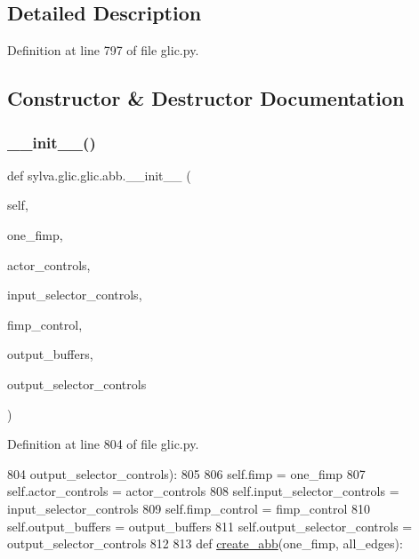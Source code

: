 \subsection{Detailed Description}


Definition at line 797 of file glic.\+py.



\subsection{Constructor \& Destructor Documentation}
\mbox{\label{classsylva_1_1glic_1_1glic_1_1abb_aa11318390c0aca19b3960f881322cf2e}} 
\subsubsection{\texorpdfstring{\+\_\+\+\_\+init\+\_\+\+\_\+()}{\_\_init\_\_()}}
{\footnotesize\ttfamily def sylva.\+glic.\+glic.\+abb.\+\_\+\+\_\+init\+\_\+\+\_\+ (\begin{DoxyParamCaption}\item[{}]{self,  }\item[{}]{one\+\_\+fimp,  }\item[{}]{actor\+\_\+controls,  }\item[{}]{input\+\_\+selector\+\_\+controls,  }\item[{}]{fimp\+\_\+control,  }\item[{}]{output\+\_\+buffers,  }\item[{}]{output\+\_\+selector\+\_\+controls }\end{DoxyParamCaption})}



Definition at line 804 of file glic.\+py.


\begin{DoxyCode}
804                  output\_selector\_controls):
805 
806       self.fimp = one\_fimp
807       self.actor\_controls = actor\_controls
808       self.input\_selector\_controls = input\_selector\_controls
809       self.fimp\_control = fimp\_control
810       self.output\_buffers = output\_buffers
811       self.output\_selector\_controls = output\_selector\_controls
812 
813   \textcolor{keyword}{def }\hyperlink{namespacesylva_1_1glic_1_1glic_a3a984424c11a0b4b6ac8890135ccbfe9}{create\_abb}(one\_fimp, all\_edges):
\end{DoxyCode}



